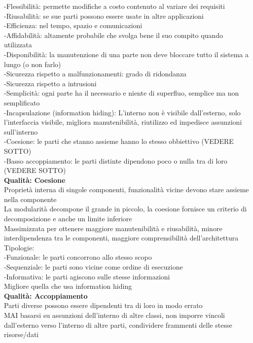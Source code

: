 \documentclass{article}
\begin{document}
		-Flessibilità: permette modifiche a costo contenuto al variare dei requisiti\\
		-Riusabilità: se sue parti possono essere usate in altre applicazioni\\
		-Efficienza: nel tempo, spazio e comunicazioni\\
		-Affidabilità: altamente probabile che svolga bene il suo compito quando utilizzata\\
		-Disponibilità: la manutenzione di una parte non deve bloccare tutto il sistema a lungo (o non farlo)\\
		-Sicurezza rispetto a malfunzionamenti: grado di ridondanza\\
		-Sicurezza rispetto a intrusioni\\
		-Semplicità: ogni parte ha il necessario e niente di superfluo, semplice ma non semplificato\\
		-Incapsulazione (information hiding): L'interno non è visibile dall'esterno, solo l'interfaccia visibile, migliora manutenibilità, riutilizzo ed impedisce assunzioni sull'interno\\
		-Coesione: le parti che stanno assieme hanno lo stesso obbiettivo (VEDERE SOTTO)\\
		-Basso accoppiamento: le parti distinte dipendono poco o nulla tra di loro (VEDERE SOTTO)\\
		
		\textbf{Qualità: Coesione}\\
		Proprietà interna di singole componenti, funzionalità vicine devono stare assieme nella componente\\
		La modularità decompone il grande in piccolo, la coesione fornisce un criterio di decomposizione e anche un limite inferiore\\
		Massimizzata per ottenere maggiore manutenibilità e riusabilità, minore interdipendenza tra le componenti, maggiore comprensibilità dell'architettura\\
		Tipologie:\\
		-Funzionale: le parti concorrono allo stesso scopo\\
		-Sequenziale: le parti sono vicine come ordine di esecuzione\\
		-Informativa: le parti agiscono sulle stesse informazioni\\
		Migliore quella che usa information hiding\\
		
		\textbf{Qualità: Accoppiamento}\\
		Parti diverse possono essere dipendenti tra di loro in modo errato\\
		MAI basarsi su assunzioni dell'interno di altre classi, non imporre vincoli dall'esterno verso l'interno di altre parti, condividere frammenti delle stesse risorse/dati\\
		
\end{document}

